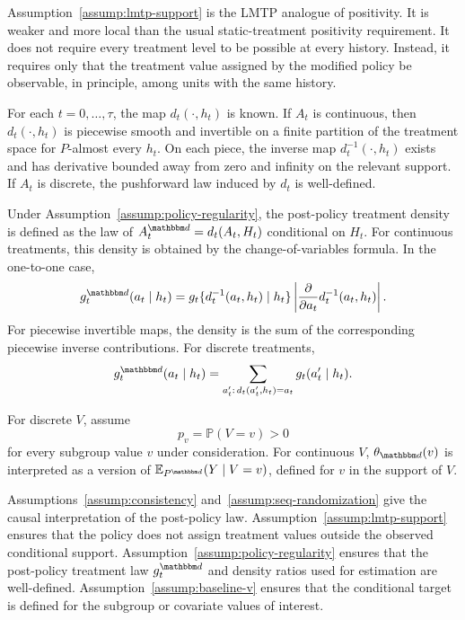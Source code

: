 \documentclass[11pt]{article}
\begin{document}
\begin{remark}
Assumption~\ref{assump:lmtp-support} is the LMTP analogue of positivity. It is
weaker and more local than the usual static-treatment positivity requirement.
It does not require every treatment level to be possible at every history.
Instead, it requires only that the treatment value assigned by the modified
policy be observable, in principle, among units with the same history.
\end{remark}

\begin{assumption}
\label{assump:policy-regularity}
For each \(t=0,\ldots,\tau\), the map \(d_t(\cdot,h_t)\) is known. If \(A_t\) is
continuous, then \(d_t(\cdot,h_t)\) is piecewise smooth and invertible on a
finite partition of the treatment space for \(P\)-almost every \(h_t\). On each
piece, the inverse map \(d_t^{-1}(\cdot,h_t)\) exists and has derivative bounded
away from zero and infinity on the relevant support. If \(A_t\) is discrete, the
pushforward law induced by \(d_t\) is well-defined.
\end{assumption}

Under Assumption~\ref{assump:policy-regularity}, the post-policy treatment
density is defined as the law of \(A_t^{\mathbbm d}=d_t(A_t,H_t)\) conditional on
\(H_t\). For continuous treatments, this density is obtained by the
change-of-variables formula. In the one-to-one case,
\[
  g_t^{\mathbbm d}(a_t\mid h_t)
  =
  g_t\{d_t^{-1}(a_t,h_t)\mid h_t\}
  \left|
    \frac{\partial}{\partial a_t}
    d_t^{-1}(a_t,h_t)
  \right|.
\]
For piecewise invertible maps, the density is the sum of the corresponding
piecewise inverse contributions. For discrete treatments,
\[
  g_t^{\mathbbm d}(a_t\mid h_t)
  =
  \sum_{a'_t:\,d_t(a'_t,h_t)=a_t}
  g_t(a'_t\mid h_t).
\]

\begin{assumption}
\label{assump:baseline-v}
For discrete \(V\), assume
\[
  p_v = \mathbb{P}(V=v)>0
\]
for every subgroup value \(v\) under consideration. For continuous \(V\),
\(\theta_{\mathbbm d}(v)\) is interpreted as a version of
\(\mathbb{E}_{P^{\mathbbm d}}(Y\mid V=v)\), defined for \(v\) in the support of
\(V\).
\end{assumption}

Assumptions~\ref{assump:consistency} and~\ref{assump:seq-randomization} give the
causal interpretation of the post-policy law. Assumption~\ref{assump:lmtp-support}
ensures that the policy does not assign treatment values outside the observed
conditional support. Assumption~\ref{assump:policy-regularity} ensures that the
post-policy treatment law \(g_t^{\mathbbm d}\) and density ratios used for
estimation are well-defined. Assumption~\ref{assump:baseline-v} ensures that the
conditional target is defined for the subgroup or covariate values of interest.
\end{document}
